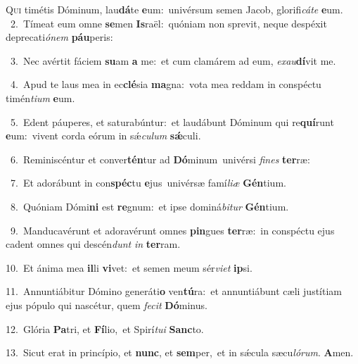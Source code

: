 \lettrine{\initial\textcolor{\initialcolor}{Q}}{ui} timétis Dóminum, lau\-\textbf{dá}\-te \textbf{e}\-um:~\star univérsum semen Jacob, glorifi\-\textit{cá}\-\textit{te} \textbf{e}\-um.\\
{\numbfont\textcolor{\numbcolor}{~2.}}~Tímeat eum omne \textbf{se}\-men \textbf{Is}\-raël:~\star quóniam non sprevit, neque despéxit deprecati\-\textit{ó}\-\textit{nem} \textbf{páu}\-peris:\par
{\numbfont\textcolor{\numbcolor}{~3.}}~Nec avértit fáciem \textbf{su}\-am \textbf{a} me:~\star et cum clamárem ad eum, \textit{ex}\-\textit{au}\textbf{dí}vit me.\par
{\numbfont\textcolor{\numbcolor}{~4.}}~Apud te laus mea in ec\-\textbf{clé}\-sia \textbf{ma}\-gna:~\star vota mea reddam in conspéctu timén\-\textit{ti}\-\textit{um} \textbf{e}\-um.\par
{\numbfont\textcolor{\numbcolor}{~5.}}~Edent páuperes, et saturabúntur:~\dagger et laudábunt Dóminum qui re\-\textbf{quí}\-runt \textbf{e}\-um:~\star vivent corda eórum in sǽ\-\textit{cu}\-\textit{lum} \textbf{sǽ}\-culi.\par
{\numbfont\textcolor{\numbcolor}{~6.}}~Reminiscéntur et conver\-\textbf{tén}\-tur ad \textbf{Dó}\-minum~\star univérsi \textit{fi}\-\textit{nes} \textbf{ter}\-ræ:\par
{\numbfont\textcolor{\numbcolor}{~7.}}~Et adorábunt in con\-\textbf{spéc}\-tu \textbf{e}\-jus~\star univérsæ famí\-\textit{li}\-\textit{æ} \textbf{Gén}\-tium.\par
{\numbfont\textcolor{\numbcolor}{~8.}}~Quóniam Dómi\textbf{ni} est \textbf{re}\-gnum:~\star et ipse dominá\-\textit{bi}\-\textit{tur} \textbf{Gén}\-tium.\par
{\numbfont\textcolor{\numbcolor}{~9.}}~Manducavérunt et adoravérunt omnes \textbf{pin}\-gues \textbf{ter}\-ræ:~\star in conspéctu ejus cadent omnes qui descén\textit{dunt} \textit{in} \textbf{ter}\-ram.\par
{\numbfont\textcolor{\numbcolor}{10.}}~Et ánima mea \textbf{il}\-li \textbf{vi}\-vet:~\star et semen meum sér\-\textit{vi}\-\textit{et} \textbf{ip}\-si.\par
{\numbfont\textcolor{\numbcolor}{11.}}~Annuntiábitur Dómino generáti\textbf{o} ven\-\textbf{tú}\-ra:~\star et annuntiábunt cæli justítiam ejus pópulo qui nascétur, quem \textit{fe}\-\textit{cit} \textbf{Dó}\-minus.\par
{\numbfont\textcolor{\numbcolor}{12.}}~Glória \textbf{Pa}\-tri, et \textbf{Fí}\-lio,~\star et Spirí\-\textit{tu}\-\textit{i} \textbf{Sanc}\-to.\par
{\numbfont\textcolor{\numbcolor}{13.}}~Sicut erat in princípio, et \textbf{nunc}\-, et \textbf{sem}\-per,~\star et in sǽcula sæcu\-\textit{ló}\-\textit{rum}. \textbf{A}\-men.\par
